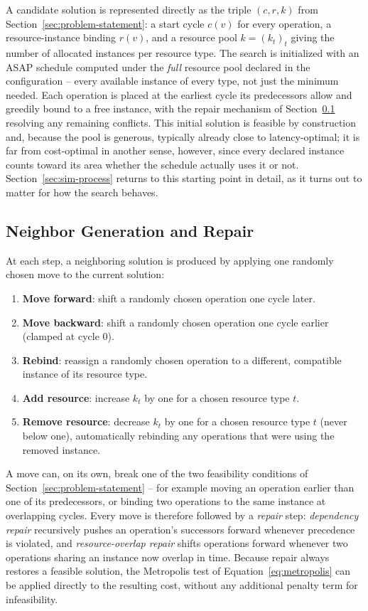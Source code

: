 \documentclass[conference]{IEEEtran}
\begin{document}
    A candidate solution is represented directly as the triple $(c, r, k)$ from
    Section~\ref{sec:problem-statement}: a start cycle $c(v)$ for every operation, a resource-instance
    binding $r(v)$, and a resource pool $k = (k_t)_t$ giving the number of allocated instances per
    resource type. The search is initialized with an ASAP schedule computed under the \emph{full}
    resource pool declared in the configuration -- every available instance of every type, not just
    the minimum needed. Each operation is placed at the earliest cycle its predecessors allow and
    greedily bound to a free instance, with the repair mechanism of Section~\ref{sec:sa-moves}
    resolving any remaining conflicts. This initial solution is feasible by construction and, because
    the pool is generous, typically already close to latency-optimal; it is far from cost-optimal in
    another sense, however, since every declared instance counts toward its area whether the schedule
    actually uses it or not. Section~\ref{sec:sim-process} returns to this starting point in detail, as
    it turns out to matter for how the search behaves.

    \subsection{Neighbor Generation and Repair}
    \label{sec:sa-moves}

    At each step, a neighboring solution is produced by applying one randomly chosen move to the
    current solution:
    \begin{enumerate}
        \item \textbf{Move forward}: shift a randomly chosen operation one cycle later.
        \item \textbf{Move backward}: shift a randomly chosen operation one cycle earlier (clamped at
        cycle $0$).
        \item \textbf{Rebind}: reassign a randomly chosen operation to a different, compatible
        instance of its resource type.
        \item \textbf{Add resource}: increase $k_t$ by one for a chosen resource type $t$.
        \item \textbf{Remove resource}: decrease $k_t$ by one for a chosen resource type $t$ (never
        below one), automatically rebinding any operations that were using the removed instance.
    \end{enumerate}
    A move can, on its own, break one of the two feasibility conditions of
    Section~\ref{sec:problem-statement} -- for example moving an operation earlier than one of its
    predecessors, or binding two operations to the same instance at overlapping cycles. Every move is
    therefore followed by a \emph{repair} step: \emph{dependency repair} recursively pushes an
    operation's successors forward whenever precedence is violated, and \emph{resource-overlap repair}
    shifts operations forward whenever two operations sharing an instance now overlap in time. Because
    repair always restores a feasible solution, the Metropolis test of
    Equation~\eqref{eq:metropolis} can be applied directly to the resulting cost, without any
    additional penalty term for infeasibility.
\end{document}
